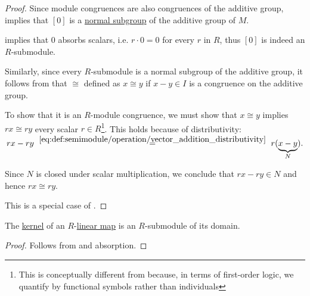 \begin{proof}
   Since module congruences are also congruences of the additive group,  implies that \( [0] \) is a \hyperref[def:normal_subgroup]{normal subgroup} of the additive group of \( M \).

   implies that \( 0 \) absorbs scalars, i.e. \( r \cdot 0 = 0 \) for every \( r \) in \( R \), thus \( [0] \) is indeed an \( R \)-submodule.

   Similarly, since every \( R \)-submodule is a normal subgroup of the additive group, it follows from  that \( {\cong} \) defined as \( x \cong y \) if \( x - y \in I \) is a congruence on the additive group.

  To show that it is an \( R \)-module congruence, we must show that \( x \cong y \) implies \( rx \cong ry \) every scalar \( r \in R \)\footnote{This is conceptually different from  because, in terms of first-order logic, we quantify by functional symbols rather than individuals}. This holds because of distributivity:
  \begin{equation*}
    rx - ry
    \reloset {\eqref{eq:def:semimodule/operation/vector_addition_distributivity}} =
    r(\underbrace{x - y}_{N}).
  \end{equation*}

  Since \( N \) is closed under scalar multiplication, we conclude that \( rx - ry \in N \) and hence \( rx \cong ry \).

   This is a special case of .
\end{proof}

\begin{proposition}\label{thm:kernel_is_submodule}
  The \hyperref[def:module/kernel]{kernel} of an \( R \)-\hyperref[def:module/homomorphism]{linear map} is an \( R \)-submodule of its domain.
\end{proposition}
\begin{proof}
  Follows from  and absorption.
\end{proof}

